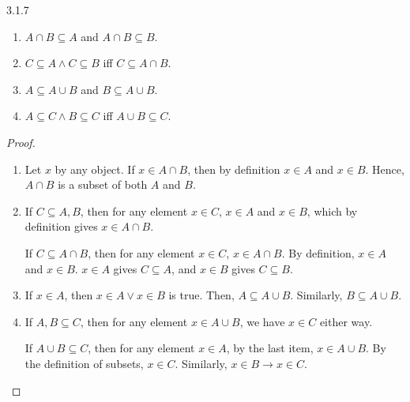 \begin{exercise}{3.1.7}
	\begin{enumerate}
		\item $A \cap B \subseteq A$ and $A \cap B \subseteq B$.
		\item $C \subseteq A \wedge C \subseteq B$ iff $C \subseteq A \cap B$.
		\item $A \subseteq A \cup B$ and $B \subseteq A \cup B$.
		\item $A \subseteq C \wedge B \subseteq C$ iff $A \cup B \subseteq C$.
	\end{enumerate}
\end{exercise}
\begin{proof}\leavevmode
	\begin{enumerate}
		\item Let $x$ by any object. If $x \in A \cap B$, then by definition $x \in A$ and $x \in B$. Hence, $A \cap B$ is a subset of both $A$ and $B$.
		
		\item If $C \subseteq A,B$, then for any element $x \in C$, $x \in A$ and $x \in B$, which by definition gives $x \in A \cap B$.
		
		If $C \subseteq A \cap B$, then for any element $x \in C$, $x \in A \cap B$. By definition, $x \in A$ and $x \in B$. $x \in A$ gives $C \subseteq A$, and $x \in B$ gives $C \subseteq B$.
		
		\item If $x \in A$, then $x \in A \vee x \in B$ is true. Then, $A \subseteq A \cup B$. Similarly, $B \subseteq A \cup B$.
		
		\item If $A,B \subseteq C$, then for any element $x \in A \cup B$, we have $x \in C$ either way.
		
		If $A \cup B \subseteq C$, then for any element $x \in A$, by the last item, $x \in A \cup B$. By the definition of subsets, $x \in C$. Similarly, $x \in B \to x \in C$.
	\end{enumerate}
\end{proof}

